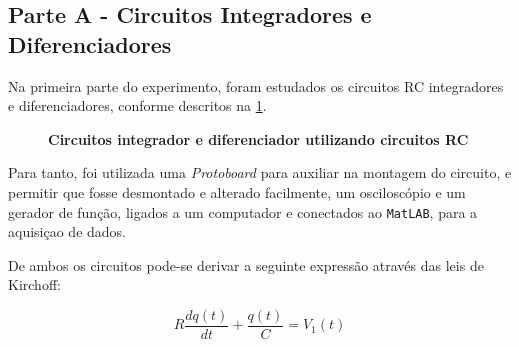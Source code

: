 \documentclass[11pt,a4paper]{article}
\begin{document}
    \subsection{Parte A - Circuitos Integradores e Diferenciadores}
    
    Na primeira parte do experimento, foram estudados os circuitos RC integradores e diferenciadores, conforme descritos na \cref{CircIntegDif}.
    
    \begin{figure}[ht] %
    \centering
        \caption{\textbf{Circuitos integrador e diferenciador utilizando circuitos RC}}
    \label{CircIntegDif} %
    \end{figure}

    Para tanto, foi utilizada uma \textit{Protoboard} para auxiliar na montagem do circuito, e permitir que fosse desmontado e alterado facilmente, um osciloscópio e um gerador de função, ligados a um computador e conectados ao \texttt{MatLAB}, para a aquisiçao de dados.
    
    De ambos os circuitos pode-se derivar a seguinte expressão através das leis de Kirchoff:
    
    \begin{equation}
        R\dfrac {dq\left( t\right) }{dt}+\dfrac {q\left( t\right) }{C}=V_{1}\left( t\right)
    \label{eq:1}
    \end{equation}
    
\end{document}
